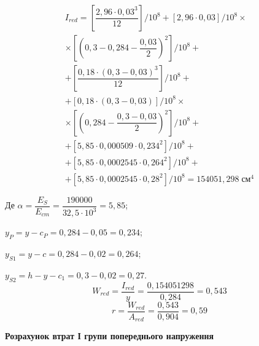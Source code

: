 \documentclass[a4paper,14pt]{article}
\begin{document}
\begin{multline*}
    I_{red} = \left[\dfrac{2,96 \cdot 0,03^3}{12}\right]/ 10^8 + \left[2,96 \cdot 0,03 \right] / 10^8 \times \\ \times \left[ \left(0,3 - 0,284 - \dfrac{0,03}{2}\right)^2\right] / 10^8 + \\ + \left[\dfrac{0,18 \cdot (0,3 - 0,03)^3}{12}\right]/ 10^8 + \\ + \left[0,18 \cdot (0,3 - 0,03)\right]/10^8 \times \\ \times \left[\left(0,284 - \dfrac{0,3 - 0,03}{2}\right)^2 \right] /10^8 + \\ + \left[5,85 \cdot 0,000509 \cdot 0,234^2\right]/10^8 +\\+ \left[5,85 \cdot 0,0002545 \cdot 0,264^2\right] / 10^8 +\\+ \left[5,85 \cdot 0,0002545 \cdot 0,28^2\right] / 10^8  = 154051,298\;\textit{см}^4
\end{multline*}

Де $\alpha = \dfrac{E_S}{E_{cm}} = \dfrac{190000}{32,5 \cdot 10^3} = 5,85$;

$y_P = y - c_P = 0,284 - 0,05 = 0,234$;

$y_{S1} = y - c = 0,284 - 0,02 = 0,264$;

$y_{S2} = h - y - c_1 = 0,3 - 0,02 = 0,27$.
\begin{equation}
    W_{red} = \dfrac{I_{red}}{y} = \dfrac{0,154051298}{0,284} = 0,543
\end{equation}
\begin{equation}
    r = \dfrac{W_{red}}{A_{red}} = \dfrac{0,543}{0,904} = 0,59
\end{equation}

\textbf{Розрахунок втрат І групи попереднього напруження}
\end{document}
